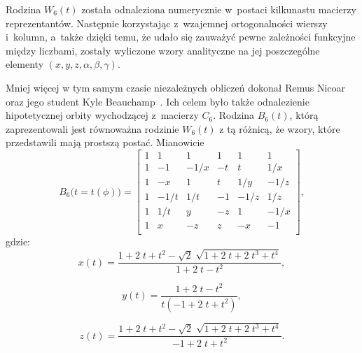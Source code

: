 \documentclass[a4paper,12pt,twoside]{article}
\begin{document}
Rodzina $W_6(t)$ zosta{\l}a odnaleziona numerycznie w~postaci kilkunastu macierzy rep\-re\-zen\-tan\-t\'{o}w. Nast\k{e}pnie korzystaj\k{a}c z~wzajemnej ortogonalno\'{s}ci wierszy i~kolumn, a~tak\.{z}e dzi\k{e}ki temu, \.{z}e uda{\l}o si\k{e} zauwa\.{z}y\'{c} pewne zale\.{z}no\'{s}ci funkcyjne mi\k{e}dzy liczbami, zosta{\l}y wyliczone wzory analityczne na jej poszczeg\'{o}lne elementy $(x, y, z, \alpha, \beta, \gamma)$.

Mniej wi\k{e}cej w tym samym czasie niezale\.{z}nych oblicze\'{n} dokona{\l} Remus Nicoar oraz jego student Kyle Beauchamp~\cite{BN06}. Ich celem by{\l}o tak\.{z}e odnalezienie hipotetycznej orbity wychodz\k{a}cej z~macierzy $C_6$. Rodzina $B_6(t)$, kt\'{o}r\k{a} zaprezentowali jest r\'{o}wnowa\.{z}na rodzinie $W_6(t)$ z t\k{a} r\'{o}\.{z}nic\k{a}, \.{z}e wzory, kt\'{o}re przedstawili maj\k{a} prostsz\k{a} posta\'{c}. Mianowicie
\begin{equation}
B_6\big(t=t(\phi)\big) =
\left[
\begin{array}{rrrrrr}
1 &    1 &    1 &  1 &    1 &    1\\
1 &   -1 & -1/x & -t &    t &  1/x\\
1 &   -x &    1 &  t &  1/y & -1/z\\
1 & -1/t &  1/t & -1 & -1/z &  1/z\\
1 &  1/t &    y & -z &    1 & -1/x\\
1 &    x &   -z &  z &   -x &   -1\\
\end{array}
\right],
\end{equation}
gdzie:
\begin{equation}
x(t) = \frac{1+2\;t+t^2-\sqrt{2}\;\sqrt{1+2\;t+2\;t^3+t^4}}{1+2\;t-t^2},
\end{equation}

\begin{equation}
y(t) = \frac{1+2\;t-t^2}{t(-1+2\;t+t^2)},
\end{equation}

\begin{equation}
z(t) = \frac{1+2\;t+t^2-\sqrt{2}\;\sqrt{1+2\;t+2\;t^3+t^4}}{-1+2\;t+t^2}.
\end{equation}
\end{document}

